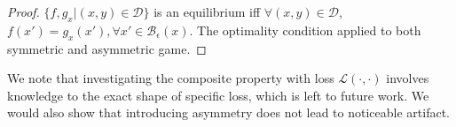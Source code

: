   \begin{proof}
  $\{f, g_x| (x, y) \in \mathcal{D}\}$ is an equilibrium iff $\forall (x, y) \in \mathcal{D}$, $f(x')=g_{x}(x'), \forall x' \in \mathcal{B}_\epsilon(x)$. The optimality condition applied to both symmetric and asymmetric game.
  \end{proof}

  We note that investigating the composite property with loss $\mathcal{L}(\cdot, \cdot)$ involves knowledge to the exact shape of specific loss, which is left to future work. We would also show that introducing asymmetry does not lead to noticeable artifact. 
\fi




